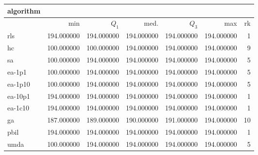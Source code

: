 \begin{tabular}{@{}l*{5}{>{{}}N{3}{0}}>{{}}N{2}{0}@{}}
\toprule
{algorithm} &  \\
\midrule
& {min} & {$Q_1$} & {med.} & {$Q_3$} & {max} & {rk}\\
\midrule
rls & {\color{blue}} 194.000000 & {\color{blue}} 194.000000 & {\color{blue}} 194.000000 & {\color{blue}} 194.000000 & {\color{blue}} 194.000000 & 1\\
hc & 100.000000 & 100.000000 & {\color{blue}} 194.000000 & {\color{blue}} 194.000000 & {\color{blue}} 194.000000 & 9\\
sa & 100.000000 & {\color{blue}} 194.000000 & {\color{blue}} 194.000000 & {\color{blue}} 194.000000 & {\color{blue}} 194.000000 & 5\\
ea-1p1 & 100.000000 & {\color{blue}} 194.000000 & {\color{blue}} 194.000000 & {\color{blue}} 194.000000 & {\color{blue}} 194.000000 & 5\\
ea-1p10 & 100.000000 & {\color{blue}} 194.000000 & {\color{blue}} 194.000000 & {\color{blue}} 194.000000 & {\color{blue}} 194.000000 & 5\\
ea-10p1 & {\color{blue}} 194.000000 & {\color{blue}} 194.000000 & {\color{blue}} 194.000000 & {\color{blue}} 194.000000 & {\color{blue}} 194.000000 & 1\\
ea-1c10 & {\color{blue}} 194.000000 & {\color{blue}} 194.000000 & {\color{blue}} 194.000000 & {\color{blue}} 194.000000 & {\color{blue}} 194.000000 & 1\\
ga & 187.000000 & 189.000000 & 190.000000 & 191.000000 & {\color{blue}} 194.000000 & 10\\
pbil & {\color{blue}} 194.000000 & {\color{blue}} 194.000000 & {\color{blue}} 194.000000 & {\color{blue}} 194.000000 & {\color{blue}} 194.000000 & 1\\
umda & 100.000000 & {\color{blue}} 194.000000 & {\color{blue}} 194.000000 & {\color{blue}} 194.000000 & {\color{blue}} 194.000000 & 5\\
\bottomrule
\end{tabular}

